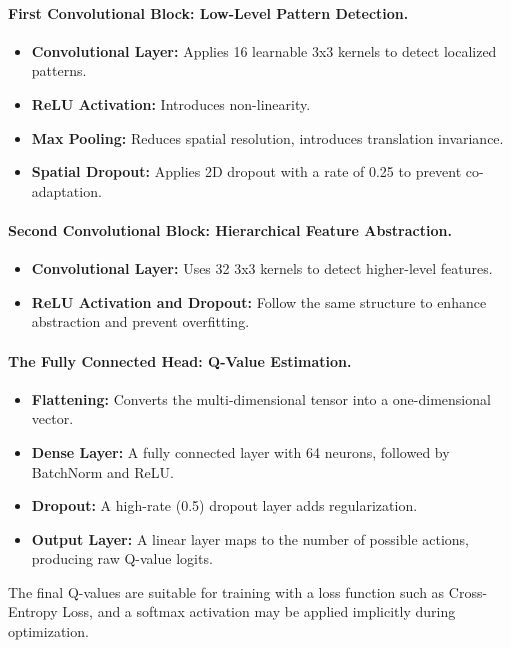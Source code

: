 \documentclass{report}
\begin{document}
\paragraph{First Convolutional Block: Low-Level Pattern Detection.}

\begin{itemize}
\item \textbf{Convolutional Layer:} Applies 16 learnable 3x3 kernels to detect localized patterns.
\item \textbf{ReLU Activation:} Introduces non-linearity.
\item \textbf{Max Pooling:} Reduces spatial resolution, introduces translation invariance.
\item \textbf{Spatial Dropout:} Applies 2D dropout with a rate of 0.25 to prevent co-adaptation.
\end{itemize}

\paragraph{Second Convolutional Block: Hierarchical Feature Abstraction.}

\begin{itemize}
\item \textbf{Convolutional Layer:} Uses 32 3x3 kernels to detect higher-level features.
\item \textbf{ReLU Activation and Dropout:} Follow the same structure to enhance abstraction and prevent overfitting.
\end{itemize}

\paragraph{The Fully Connected Head: Q-Value Estimation.}

\begin{itemize}
\item \textbf{Flattening:} Converts the multi-dimensional tensor into a one-dimensional vector.
\item \textbf{Dense Layer:} A fully connected layer with 64 neurons, followed by BatchNorm and ReLU.
\item \textbf{Dropout:} A high-rate (0.5) dropout layer adds regularization.
\item \textbf{Output Layer:} A linear layer maps to the number of possible actions, producing raw Q-value logits.
\end{itemize}

The final Q-values are suitable for training with a loss function such as Cross-Entropy Loss, and a softmax activation may be applied implicitly during optimization.
\end{document}
